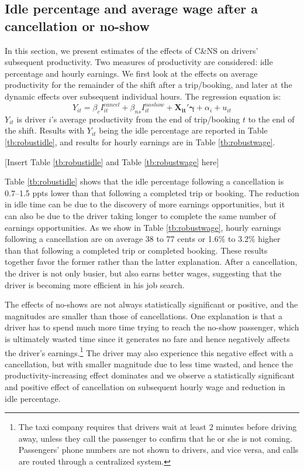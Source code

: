 \documentclass[reviewmode]{restud}
\begin{document}
\subsection{Idle percentage and average wage after a cancellation or no-show}
In this section, we present estimates of the effects of C\&NS on drivers' subsequent productivity. Two measures of productivity are considered: idle percentage and hourly earnings. We first look at the effects on average productivity for the remainder of the shift after a trip/booking, and later at the dynamic effects over subsequent individual hours. The regression equation is:
\begin{equation}
\label{eq:outcomes}
Y_{it} = \beta_c I^{cancel}_{it} + \beta_{ns} I^{noshow}_{it} + \mathbf{X_{it}}'\mathbf{\gamma} + \alpha_i  + u_{it}
\end{equation}
$Y_{it}$ is driver $i$'s average productivity from the end of trip/booking $t$ to the end of the shift. Results with $Y_{it}$ being the idle percentage are reported in Table \ref{tb:robustidle}, and results for hourly earnings are in Table \ref{tb:robustwage}.

\begin{center}
	[Insert Table \ref{tb:robustidle} and Table \ref{tb:robustwage} here]
\end{center}

Table \ref{tb:robustidle} shows that the idle percentage following a cancellation is 0.7--1.5 ppts lower than that following a completed trip or booking. The reduction in idle time can be due to the discovery of more earnings opportunities, but it can also be due to the driver taking longer to complete the same number of earnings opportunities. As we show in Table \ref{tb:robustwage}, hourly earnings following a cancellation are on average 38 to 77 cents or 1.6\% to 3.2\% higher than that following a completed trip or completed booking. These results together favor the former rather than the latter explanation. After a cancellation, the driver is not only busier, but also earns better wages, suggesting that the driver is becoming more efficient in his job search. 

The effects of no-shows are not always statistically significant or positive, and the magnitudes are smaller than those of cancellations. One explanation is that a driver has to spend much more time trying to reach the no-show passenger, which is ultimately wasted time since it generates no fare and hence negatively affects the driver's earnings.\footnote{The taxi company requires that drivers wait at least 2 minutes before driving away, unless they call the passenger to confirm that he or she is not coming. Passengers' phone numbers are not shown to drivers, and vice versa, and calls are routed through a centralized system.} The driver may also experience this negative effect with a cancellation, but with smaller magnitude due to less time wasted, and hence the productivity-increasing effect dominates and we observe a statistically significant and positive effect of cancellation on subsequent hourly wage and reduction in idle percentage.
\end{document}
